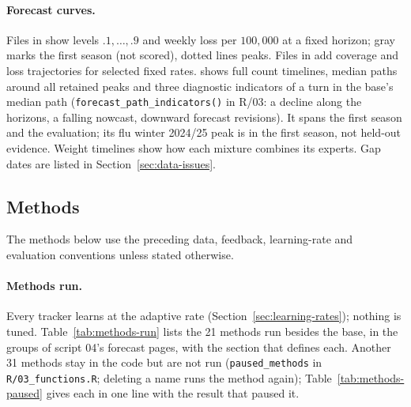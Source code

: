 \documentclass[11pt,a4paper]{article}
\theoremstyle{definition}
\theoremstyle{remark}
\begin{document}
\paragraph{Forecast curves.}
Files in  show levels $.1,\ldots,.9$ and
weekly loss per $100{,}000$ at a fixed horizon; gray marks the first
season (not scored), dotted lines peaks. Files in  add coverage
and loss trajectories for selected fixed rates.
 shows full count timelines, median
paths around all retained peaks and three diagnostic indicators of a turn
in the base's median path (\texttt{forecast\_path\_indicators()} in R/03:
a decline along the horizons, a falling nowcast, downward forecast
revisions). It spans the first season and
the evaluation; its flu winter 2024/25 peak is in the first season, not
held-out evidence.
Weight timelines show how each mixture combines its experts.
Gap dates are listed in Section~\ref{sec:data-issues}.

\subsection{Methods}
\label{sec:methods}
The methods below use the preceding data, feedback, learning-rate and
evaluation conventions unless stated otherwise.

\paragraph{Methods run.} Every tracker learns at the adaptive rate
(Section~\ref{sec:learning-rates}); nothing is tuned.
Table~\ref{tab:methods-run} lists the 21 methods run besides the base, in
the groups of script 04's forecast pages, with the section that defines
each. Another 31 methods stay in the code but are not run
(\texttt{paused\_methods} in \texttt{R/03\_functions.R}; deleting a name
runs the method again); Table~\ref{tab:methods-paused} gives each in one
line with the result that paused it.
\end{document}
